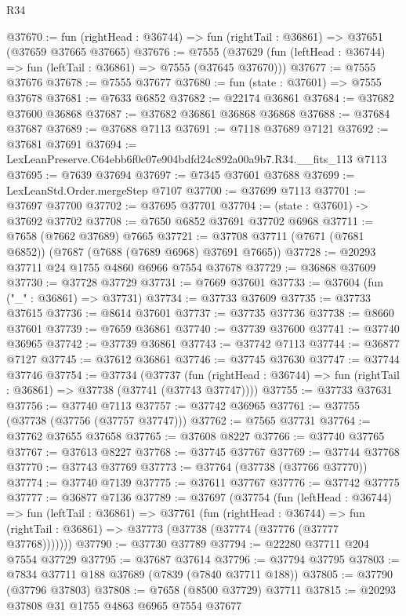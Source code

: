 \begin{lexlean}{R34}
\begin{coremodule}
@37670 := fun (rightHead : @36744) => fun (rightTail : @36861) => @37651 (@37659 @37665 @37665)
@37676 := @7555
    (@37629 (fun (leftHead : @36744) => fun (leftTail : @36861) => @7555 (@37645 @37670)))
@37677 := @7555 @37676
@37678 := @7555 @37677
@37680 := fun (state : @37601) => @7555 @37678
@37681 := @7633 @6852
@37682 := @22174 @36861
@37684 := @37682 @37600 @36868
@37687 := @37682 @36861 @36868 @36868
@37688 := @37684 @37687
@37689 := @37688 @7113
@37691 := @7118 @37689 @7121
@37692 := @37681 @37691
@37694 := LexLeanPreserve.C64ebb6f0c07e904bdfd24c892a00a9b7.R34.__fits_113 @7113
@37695 := @7639 @37694
@37697 := @7345 @37601 @37688
@37699 := LexLeanStd.Order.mergeStep @7107
@37700 := @37699 @7113
@37701 := @37697 @37700
@37702 := @37695 @37701
@37704 := (state : @37601) -> @37692 @37702
@37708 := @7650 @6852 @37691 @37702 @6968
@37711 := @7658 (@7662 @37689) @7665
@37721 := @37708 @37711 (@7671 (@7681 @6852)) (@7687 (@7688 (@7689 @6968) @37691 @7665))
@37728 := @20293 @37711 @24 @1755 @4860 @6966 @7554 @37678
@37729 := @36868 @37609
@37730 := @37728 @37729
@37731 := @7669 @37601
@37733 := @37604 (fun ("_" : @36861) => @37731)
@37734 := @37733 @37609
@37735 := @37733 @37615
@37736 := @8614 @37601
@37737 := @37735 @37736
@37738 := @8660 @37601
@37739 := @7659 @36861
@37740 := @37739 @37600
@37741 := @37740 @36965
@37742 := @37739 @36861
@37743 := @37742 @7113
@37744 := @36877 @7127
@37745 := @37612 @36861
@37746 := @37745 @37630
@37747 := @37744 @37746
@37754 := @37734
    (@37737
      (fun (rightHead : @36744) => fun (rightTail : @36861) => @37738 (@37741 (@37743 @37747))))
@37755 := @37733 @37631
@37756 := @37740 @7113
@37757 := @37742 @36965
@37761 := @37755 (@37738 (@37756 (@37757 @37747)))
@37762 := @7565 @37731
@37764 := @37762 @37655 @37658
@37765 := @37608 @8227
@37766 := @37740 @37765
@37767 := @37613 @8227
@37768 := @37745 @37767
@37769 := @37744 @37768
@37770 := @37743 @37769
@37773 := @37764 (@37738 (@37766 @37770))
@37774 := @37740 @7139
@37775 := @37611 @37767
@37776 := @37742 @37775
@37777 := @36877 @7136
@37789 := @37697
    (@37754
      (fun (leftHead : @36744) =>
      fun (leftTail : @36861) =>
      @37761
        (fun (rightHead : @36744) =>
        fun (rightTail : @36861) => @37773 (@37738 (@37774 (@37776 (@37777 @37768)))))))
@37790 := @37730 @37789
@37794 := @22280 @37711 @204 @7554 @37729
@37795 := @37687 @37614
@37796 := @37794 @37795
@37803 := @7834 @37711 @188 @37689 (@7839 (@7840 @37711 @188))
@37805 := @37790 (@37796 @37803)
@37808 := @7658 (@8500 @37729) @37711
@37815 := @20293 @37808 @31 @1755 @4863 @6965 @7554 @37677

\end{coremodule}
\end{lexlean}
